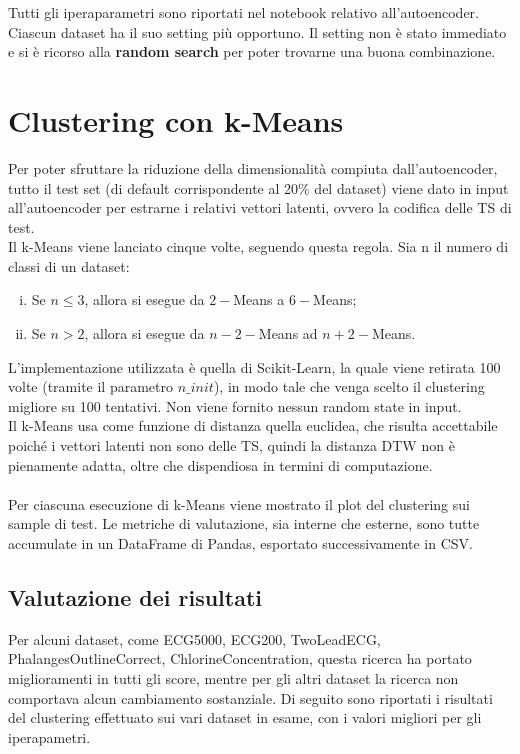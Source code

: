 Tutti gli iperaparametri sono riportati nel notebook relativo all'autoencoder. Ciascun dataset ha il suo setting più opportuno. Il setting non è stato immediato e si è ricorso alla \textbf{random search} per poter trovarne una buona combinazione.\\

\section{Clustering con k-Means}
Per poter sfruttare la riduzione della dimensionalità compiuta dall'autoencoder, tutto il test set (di default corrispondente al 20\% del dataset) viene dato in input all'autoencoder per estrarne i relativi vettori latenti, ovvero la codifica delle TS di test.\\
Il k-Means viene lanciato cinque volte, seguendo questa regola. Sia n il numero di classi di un dataset:
\begin{enumerate}[(i)]
	\item Se $n\leq3$, allora si esegue da $2-$Means a $6-$Means;
	\item Se $n>2$, allora si esegue da $n-2-$Means ad $n+2-$Means.
\end{enumerate}
L'implementazione utilizzata è quella di Scikit-Learn, la quale viene retirata 100 volte (tramite il parametro $n\_init$), in modo tale che venga scelto il clustering migliore su 100 tentativi. Non viene fornito nessun random state in input.\\
Il k-Means usa come funzione di distanza quella euclidea, che risulta accettabile poiché i vettori latenti non sono delle TS, quindi la distanza DTW non è pienamente adatta, oltre che dispendiosa in termini di computazione.\\
\\
Per ciascuna esecuzione di k-Means viene mostrato il plot del clustering sui sample di test. Le metriche di valutazione, sia interne che esterne, sono tutte accumulate in un DataFrame di Pandas, esportato successivamente in CSV.

\subsection{Valutazione dei risultati}
Per alcuni dataset, come ECG5000, ECG200, TwoLeadECG, PhalangesOutlineCorrect, ChlorineConcentration, questa ricerca ha portato miglioramenti in tutti gli score, mentre per gli altri dataset la ricerca non comportava alcun cambiamento sostanziale.
Di seguito sono riportati i risultati del clustering effettuato sui vari dataset in esame, con i valori migliori per gli iperapametri.

